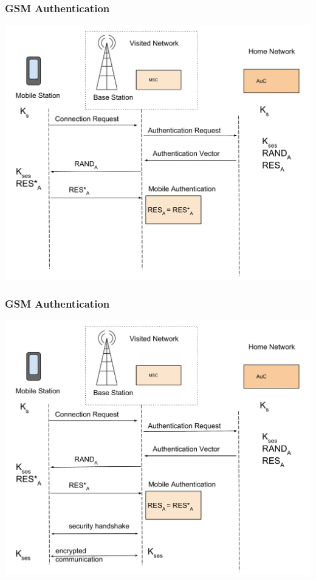 \documentclass{beamer}
\begin{document}
\begin{frame}
  \frametitle{GSM Authentication}
  \begin{center}
  \includegraphics[width=.9\textwidth, height=.85\textheight]{Images/GSMAuthentication3.pdf}

  \end{center} 
\end{frame}
\begin{frame}
  \frametitle{GSM Authentication}
  \begin{center}
  \includegraphics[width=.9\textwidth, height=.85\textheight]{Images/GSMAuthentication4.pdf}

  \end{center} 
\end{frame}
\end{document}
